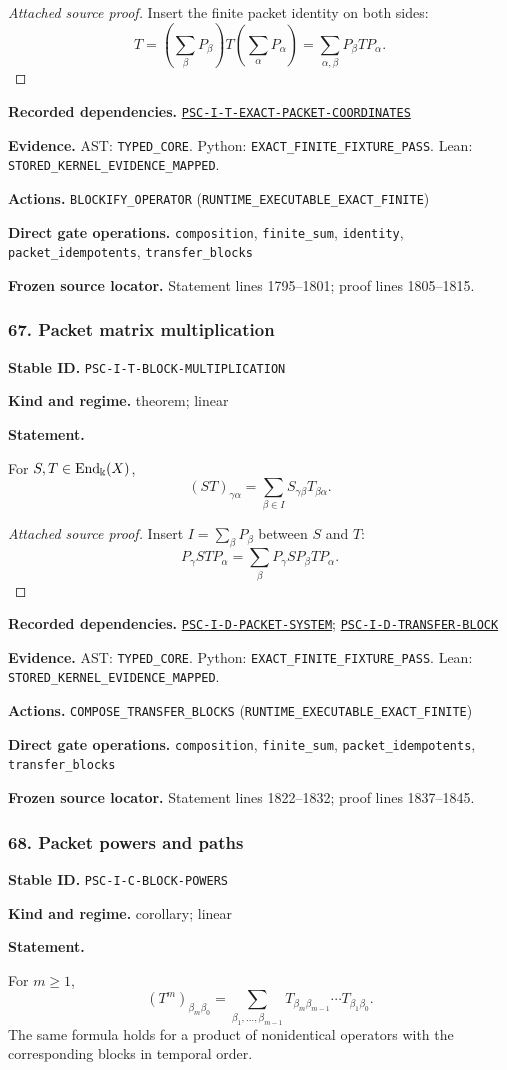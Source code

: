 \documentclass[a4paper,11pt]{article}
\newcommand{\bbk}{\Bbbk}\newcommand{\A}{\mathcal A}\newcommand{\B}{\mathcal B}\newcommand{\Ccal}{\mathcal C}\newcommand{\Pcal}{\mathcal P}\newcommand{\Qcal}{\mathcal Q}\newcommand{\Rcal}{\mathcal R}\newcommand{\Scal}{\mathcal S}
\newcommand{\field}[2]{\noindent\textbf{#1.} #2\par}
\begin{document}
\begin{proof}[Attached source proof]
Insert the finite packet identity on both sides:
\[
T=
\left(\sum_\beta P_\beta\right)
T
\left(\sum_\alpha P_\alpha\right)
=
\sum_{\alpha,\beta}P_\beta TP_\alpha.
\]
\end{proof}
\field{Recorded dependencies}{\hyperref[rec:PSC-I-T-EXACT-PACKET-COORDINATES]{\nolinkurl{PSC-I-T-EXACT-PACKET-COORDINATES}}}
\field{Evidence}{AST: \nolinkurl{TYPED_CORE}. Python: \nolinkurl{EXACT_FINITE_FIXTURE_PASS}. Lean: \nolinkurl{STORED_KERNEL_EVIDENCE_MAPPED}.}
\field{Actions}{\nolinkurl{BLOCKIFY_OPERATOR} (\nolinkurl{RUNTIME_EXECUTABLE_EXACT_FINITE})}
\field{Direct gate operations}{\nolinkurl{composition}, \nolinkurl{finite_sum}, \nolinkurl{identity}, \nolinkurl{packet_idempotents}, \nolinkurl{transfer_blocks}}
\field{Frozen source locator}{Statement lines 1795--1801; proof lines 1805--1815.}
\subsubsection*{67. Packet matrix multiplication}
\label{rec:PSC-I-T-BLOCK-MULTIPLICATION}
\field{Stable ID}{\nolinkurl{PSC-I-T-BLOCK-MULTIPLICATION}}
\field{Kind and regime}{theorem; linear}
\textbf{Statement.}\par
For $S,T\in\End_{\bbk}(X)$,
\[
\boxed{
(ST)_{\gamma\alpha}
=
\sum_{\beta\in I}S_{\gamma\beta}T_{\beta\alpha}.
}
\]

\begin{proof}[Attached source proof]
Insert $I=\sum_\beta P_\beta$ between $S$ and $T$:
\[
P_\gamma STP_\alpha
=
\sum_\beta
P_\gamma SP_\beta TP_\alpha.
\]
\end{proof}
\field{Recorded dependencies}{\hyperref[rec:PSC-I-D-PACKET-SYSTEM]{\nolinkurl{PSC-I-D-PACKET-SYSTEM}}; \hyperref[rec:PSC-I-D-TRANSFER-BLOCK]{\nolinkurl{PSC-I-D-TRANSFER-BLOCK}}}
\field{Evidence}{AST: \nolinkurl{TYPED_CORE}. Python: \nolinkurl{EXACT_FINITE_FIXTURE_PASS}. Lean: \nolinkurl{STORED_KERNEL_EVIDENCE_MAPPED}.}
\field{Actions}{\nolinkurl{COMPOSE_TRANSFER_BLOCKS} (\nolinkurl{RUNTIME_EXECUTABLE_EXACT_FINITE})}
\field{Direct gate operations}{\nolinkurl{composition}, \nolinkurl{finite_sum}, \nolinkurl{packet_idempotents}, \nolinkurl{transfer_blocks}}
\field{Frozen source locator}{Statement lines 1822--1832; proof lines 1837--1845.}
\subsubsection*{68. Packet powers and paths}
\label{rec:PSC-I-C-BLOCK-POWERS}
\field{Stable ID}{\nolinkurl{PSC-I-C-BLOCK-POWERS}}
\field{Kind and regime}{corollary; linear}
\textbf{Statement.}\par
For $m\geq1$,
\[
(T^m)_{\beta_m\beta_0}
=
\sum_{\beta_1,\ldots,\beta_{m-1}}
T_{\beta_m\beta_{m-1}}
\cdots
T_{\beta_1\beta_0}.
\]
The same formula holds for a product of nonidentical operators with the corresponding blocks in temporal order.
\end{document}
